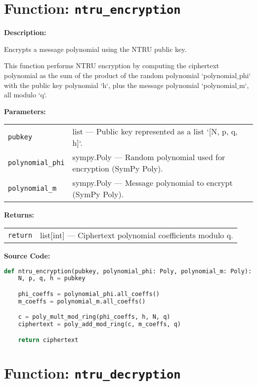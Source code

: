 \documentclass[a4paper,12pt]{article}
\begin{document}
\section*{Function: \texttt{ntru\_encryption}}

\textbf{Description:}

Encrypts a message polynomial using the NTRU public key.

This function performs NTRU encryption by computing the ciphertext polynomial as
the sum of the product of the random polynomial `polynomial$\_$phi` with the public key polynomial `h`,
plus the message polynomial `polynomial$\_$m`, all modulo `q`.

\vspace{1em}
\textbf{Parameters:}

\vspace{1em}
\noindent
\begin{tabular}{p{3cm} p{11cm}}
\texttt{pubkey} & list — Public key represented as a list `[N, p, q, h]`. \\
\texttt{polynomial\_phi} & sympy.Poly — Random polynomial used for encryption (SymPy Poly). \\
\texttt{polynomial\_m} & sympy.Poly — Message polynomial to encrypt (SymPy Poly). \\
\end{tabular}

\vspace{1em}
\noindent
\textbf{Returns:}

\begin{tabular}{p{3cm} p{11cm}}
\texttt{return} & list[int] — Ciphertext polynomial coefficients modulo q. \\
\end{tabular}

\vspace{1em}
\textbf{Source Code:}

\begin{lstlisting}[language=Python]
def ntru_encryption(pubkey, polynomial_phi: Poly, polynomial_m: Poly):
    N, p, q, h = pubkey

    phi_coeffs = polynomial_phi.all_coeffs()
    m_coeffs = polynomial_m.all_coeffs()

    c = poly_mult_mod_ring(phi_coeffs, h, N, q)
    ciphertext = poly_add_mod_ring(c, m_coeffs, q)

    return ciphertext
\end{lstlisting}

\section*{Function: \texttt{ntru\_decryption}}
\end{document}
